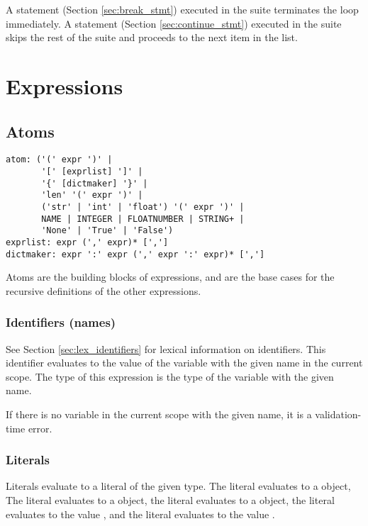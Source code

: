 A  statement (Section \ref{sec:break_stmt}) executed in the suite
terminates the loop immediately. A  statement (Section
\ref{sec:continue_stmt}) executed in the suite skips the rest of the suite and
proceeds to the next item in the list.


\section{Expressions}
\label{sec:expr}

\subsection{Atoms}

\begin{lstlisting}
atom: ('(' expr ')' |
       '[' [exprlist] ']' |
       '{' [dictmaker] '}' |
       'len' '(' expr ')' |
       ('str' | 'int' | 'float') '(' expr ')' |
       NAME | INTEGER | FLOATNUMBER | STRING+ |
       'None' | 'True' | 'False')
exprlist: expr (',' expr)* [',']
dictmaker: expr ':' expr (',' expr ':' expr)* [',']
\end{lstlisting}

Atoms are the building blocks of expressions, and are the base cases for the
recursive definitions of the other expressions.

\subsubsection{Identifiers (names)}
See Section \ref{sec:lex_identifiers} for lexical information on identifiers.
This identifier evaluates to the value of the variable with the given name
in the current scope. The type of this expression is the type of the variable
with the given name.

If there is no variable in the current scope with the given name, it is a
validation-time error.

\subsubsection{Literals}
Literals evaluate to a literal of the given type. The  literal
evaluates to a  object, The  literal evaluates to a
 object, the  literal evaluates to a 
object, the  literal evaluates to the  value
, and the  literal evaluates to the 
value .


